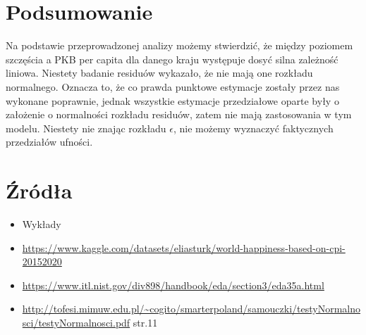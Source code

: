 \documentclass{article}
\theoremstyle{break}
\begin{document}
	\section{Podsumowanie}
	
	Na podstawie przeprowadzonej analizy możemy stwierdzić, że między poziomem szczęścia a PKB per capita dla danego kraju występuje dosyć silna zależność liniowa. Niestety badanie residuów wykazało, że nie mają one rozkładu normalnego. Oznacza to, że co prawda punktowe estymacje zostały przez nas wykonane poprawnie, jednak wszystkie estymacje przedziałowe oparte były o założenie o normalności rozkładu residuów, zatem nie mają zastosowania w tym modelu. Niestety nie znając rozkładu $\epsilon$, nie możemy wyznaczyć faktycznych przedziałów ufności.
	
	\section{Źródła}
	\begin{itemize}
		\item Wykłady
		\item \url{https://www.kaggle.com/datasets/eliasturk/world-happiness-based-on-cpi-20152020}
		\item \url{https://www.itl.nist.gov/div898/handbook/eda/section3/eda35a.html}
		\item \url{http://tofesi.mimuw.edu.pl/~cogito/smarterpoland/samouczki/testyNormalnosci/testyNormalnosci.pdf} str.11
		
	\end{itemize}
	
	
\end{document}
